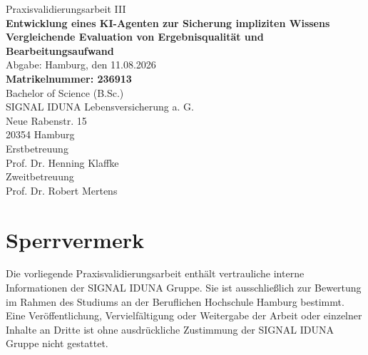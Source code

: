 \documentclass[
  10pt,
  ngerman,
  a4paper,
  toc=graduated,
  numbers=noenddot,
  headings=standardclasses
]{scrartcl}
\begin{document}
\hypersetup{pageanchor=false}
\thispagestyle{empty}

\vspace*{1.5cm}
\begin{center}
  {\Large Praxisvalidierungsarbeit III}\\[2.8cm]
  {\huge\bfseries Entwicklung eines KI-Agenten zur Sicherung impliziten Wissens}\\[0.5cm]
  {\LARGE\bfseries Vergleichende Evaluation von Ergebnisqualität und Bearbeitungsaufwand}\\[2.3cm]

  Abgabe: Hamburg, den 11.08.2026\\[2.5\baselineskip]
  {\bfseries\textcolor{ihkblue}{Matrikelnummer: 236913}}\\[1.5\baselineskip]
  Bachelor of Science (B.Sc.)\\[3\baselineskip]

  SIGNAL IDUNA Lebensversicherung a. G.\\
  Neue Rabenstr. 15\\
  20354 Hamburg\\[2.5\baselineskip]

  Erstbetreuung\\
  Prof. Dr. Henning Klaffke\\[2\baselineskip]

  Zweitbetreuung\\
  Prof. Dr. Robert Mertens
\end{center}

\newpage
\hypersetup{pageanchor=true}
\tableofcontents

\newpage
\section*{Sperrvermerk}
Die vorliegende Praxisvalidierungsarbeit enthält vertrauliche interne Informationen der SIGNAL IDUNA Gruppe. Sie ist ausschließlich zur Bewertung im Rahmen des Studiums an der Beruflichen Hochschule Hamburg bestimmt. Eine Veröffentlichung, Vervielfältigung oder Weitergabe der Arbeit oder einzelner Inhalte an Dritte ist ohne ausdrückliche Zustimmung der SIGNAL IDUNA Gruppe nicht gestattet.
\end{document}

